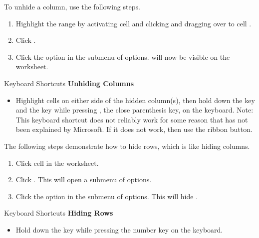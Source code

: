 To unhide a column, use the following steps.

\begin{enumerate}
	\item Highlight the range  by activating cell  and clicking and dragging over to cell .
	\item Click . 
	\item Click the  option in the submenu of options.  will now be visible on the worksheet.
\end{enumerate}

\begin{center}
	\begin{shtcutbox}{Keyboard Shortcuts}
		\textbf{Unhiding Columns}
		\\
		\begin{itemize}
			\setlength{\itemsep}{0pt}
			\setlength{\parskip}{0pt}
			\setlength{\parsep}{0pt}
			
			\item Highlight cells on either side of the hidden column(s), then hold down the  key and the  key while pressing \fmtKeystroke{)}, the close parenthesis key, on the keyboard. Note: This keyboard shortcut does not reliably work for some reason that has not been explained by Microsoft. If it does not work, then use the ribbon button.
			
		\end{itemize}
	\end{shtcutbox}
\end{center}

The following steps demonstrate how to hide rows, which is like hiding columns.

\begin{enumerate}
	\item Click cell  in the  worksheet.
	\item Click . This will open a submenu of options.
	\item Click the  option in the submenu of options. This will hide .
\end{enumerate}

\begin{center}
	\begin{shtcutbox}{Keyboard Shortcuts}
		\textbf{Hiding Rows}
		\\
		\begin{itemize}
			\setlength{\itemsep}{0pt}
			\setlength{\parskip}{0pt}
			\setlength{\parsep}{0pt}
			
			\item Hold down the  key while pressing the number  key on the keyboard.
			
		\end{itemize}
	\end{shtcutbox}
\end{center}

